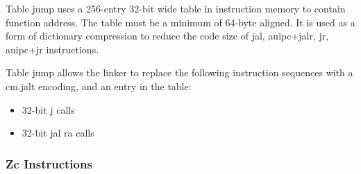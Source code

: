 \documentclass[main\_\_EN.tex]{subfiles}
\begin{document}
Table jump uses a 256-entry 32-bit wide table in instruction memory to contain function address. The table must be a minimum of 64-byte aligned. It is used as a form of dictionary compression to reduce the code size of jal, auipc+jalr, jr, auipc+jr instructions.

Table jump allows the linker to replace the following instruction sequences with a cm.jalt encoding, and an entry in the table:

\begin{itemize}
    \item 32-bit j calls
    \item 32-bit jal ra calls
\end{itemize}

\subsubsection{Zc Instructions}
\label{sec:riscvcpu-zc-insn-descr}
\end{document}

